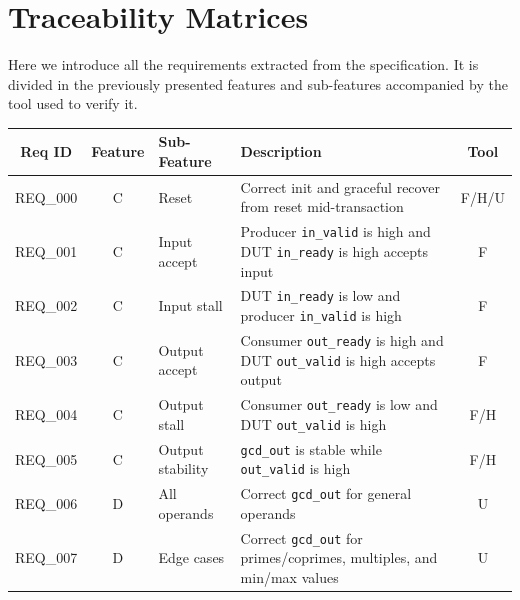 \section{Traceability Matrices}
Here we introduce all the requirements extracted from the specification.
It is divided in the previously presented features and sub-features accompanied by the tool used to verify it.
\begin{table}[H]
    \centering
    \begin{tabularx}{\textwidth}{|c|c|l|X|c|}
        \toprule
        \textbf{Req ID} & \textbf{Feature}  & \textbf{Sub-Feature}  & \textbf{Description}                                                                      & \textbf{Tool} \\ \midrule
        REQ\_000        & C                 & Reset                 & Correct init and graceful recover from reset mid-transaction                              & F/H/U         \\ \midrule
        REQ\_001        & C                 & Input accept          & Producer \texttt{in\_valid} is high and DUT \texttt{in\_ready} is high accepts input      & F             \\ \midrule
        REQ\_002        & C                 & Input stall           & DUT \texttt{in\_ready} is low and producer \texttt{in\_valid} is high                     & F             \\ \midrule
        REQ\_003        & C                 & Output accept         & Consumer \texttt{out\_ready} is high and DUT \texttt{out\_valid} is high accepts output   & F             \\ \midrule
        REQ\_004        & C                 & Output stall          & Consumer \texttt{out\_ready} is low and DUT \texttt{out\_valid} is high                   & F/H           \\ \midrule
        REQ\_005        & C                 & Output stability      & \texttt{gcd\_out} is stable while \texttt{out\_valid} is high                             & F/H           \\ \bottomrule \toprule
        REQ\_006        & D                 & All operands          & Correct \texttt{gcd\_out} for general operands                                            & U             \\ \midrule
        REQ\_007        & D                 & Edge cases            & Correct \texttt{gcd\_out} for primes/coprimes, multiples, and min/max values              & U             \\ \midrule

\end{tabularx}
\end{table}

